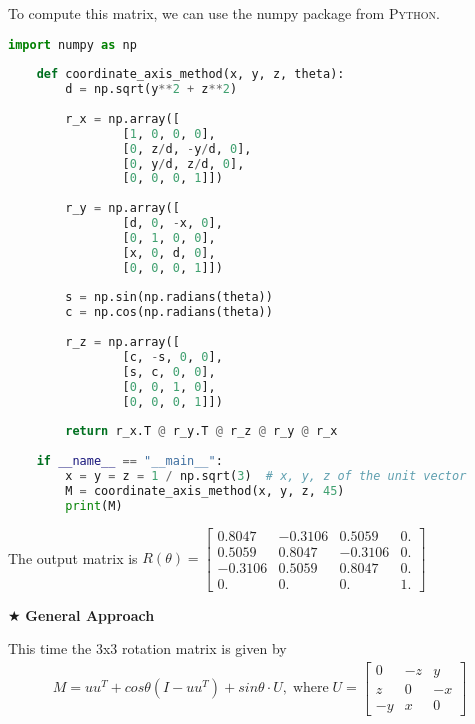 \documentclass[11pt]{article}  %
\begin{document}
    To compute this matrix, we can use the numpy package from \textsc{Python}.\\
    \begin{lstlisting}[language=python,numbers=none]
    import numpy as np
    
    def coordinate_axis_method(x, y, z, theta):
        d = np.sqrt(y**2 + z**2)
    
        r_x = np.array([
                [1, 0, 0, 0],
                [0, z/d, -y/d, 0],
                [0, y/d, z/d, 0],
                [0, 0, 0, 1]])
    
        r_y = np.array([
                [d, 0, -x, 0],
                [0, 1, 0, 0],
                [x, 0, d, 0],
                [0, 0, 0, 1]])
    
        s = np.sin(np.radians(theta))
        c = np.cos(np.radians(theta))
    
        r_z = np.array([
                [c, -s, 0, 0],
                [s, c, 0, 0],
                [0, 0, 1, 0],
                [0, 0, 0, 1]])
    
        return r_x.T @ r_y.T @ r_z @ r_y @ r_x
    
    if __name__ == "__main__":
        x = y = z = 1 / np.sqrt(3)  # x, y, z of the unit vector
        M = coordinate_axis_method(x, y, z, 45)
        print(M)
    \end{lstlisting}
    
    The output matrix is
    $R(\theta) = \begin{bmatrix}
    0.8047  & -0.3106 &  0.5059 &  0.\\
    0.5059  &  0.8047 & -0.3106 &  0.\\
    -0.3106 &  0.5059 &  0.8047 &  0.\\
    0.      &  0.     &  0.     &  1.
    \end{bmatrix}$\\

    \newpage
    
    \noindent $\bigstar$ \textbf{ General Approach}\vspace{2mm}
    
    This time the 3x3 rotation matrix is given by
    \begin{align*}
        M=uu^T+cos\theta (I-uu^T)+sin\theta \cdot U,\; \text{where}\; U=
        \begin{bmatrix}
            0 & -z & y\\
            z & 0 & -x\\
            -y & x & 0
        \end{bmatrix}
    \end{align*}
    
\end{document}
